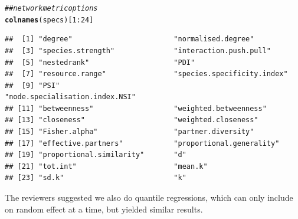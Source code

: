 \documentclass{article}\usepackage[]{graphicx}\usepackage[]{color}
\makeatletter
\newcommand{\hlnum}[1]{\textcolor[rgb]{0.686,0.059,0.569}{#1}}%
\newcommand{\hlcom}[1]{\textcolor[rgb]{0.678,0.584,0.686}{\textit{#1}}}%
\newcommand{\hlopt}[1]{\textcolor[rgb]{0,0,0}{#1}}%
\newcommand{\hlstd}[1]{\textcolor[rgb]{0.345,0.345,0.345}{#1}}%
\newcommand{\hlkwd}[1]{\textcolor[rgb]{0.737,0.353,0.396}{\textbf{#1}}}%
\newenvironment{kframe}{%
 \def\at@end@of@kframe{}%
 \ifinner\ifhmode%
  \def\at@end@of@kframe{\end{minipage}}%
  \begin{minipage}{\columnwidth}%
 \fi\fi%
 \def\FrameCommand##1{\hskip\@totalleftmargin \hskip-\fboxsep
 \colorbox{shadecolor}{##1}\hskip-\fboxsep
     \hskip-\linewidth \hskip-\@totalleftmargin \hskip\columnwidth}%
 \MakeFramed {\advance\hsize-\width
   \@totalleftmargin\z@ \linewidth\hsize
   \@setminipage}}%
 {\par\unskip\endMakeFramed%
 \at@end@of@kframe}
\newenvironment{knitrout}{}{} %
\makeatother
\begin{document}
\begin{knitrout}
\color{fgcolor}\begin{kframe}
\begin{alltt}
 \hlcom{## network metric options}
 \hlkwd{colnames}\hlstd{(specs)[}\hlnum{1}\hlopt{:}\hlnum{24}\hlstd{]}
\end{alltt}
\begin{verbatim}
##  [1] "degree"                        "normalised.degree"            
##  [3] "species.strength"              "interaction.push.pull"        
##  [5] "nestedrank"                    "PDI"                          
##  [7] "resource.range"                "species.specificity.index"    
##  [9] "PSI"                           "node.specialisation.index.NSI"
## [11] "betweenness"                   "weighted.betweenness"         
## [13] "closeness"                     "weighted.closeness"           
## [15] "Fisher.alpha"                  "partner.diversity"            
## [17] "effective.partners"            "proportional.generality"      
## [19] "proportional.similarity"       "d"                            
## [21] "tot.int"                       "mean.k"                       
## [23] "sd.k"                          "k"
\end{verbatim}
\end{kframe}
\end{knitrout}

The reviewers suggested we also do quantile regressions, which can only
include on random effect at a time, but yielded similar results.
\end{document}
